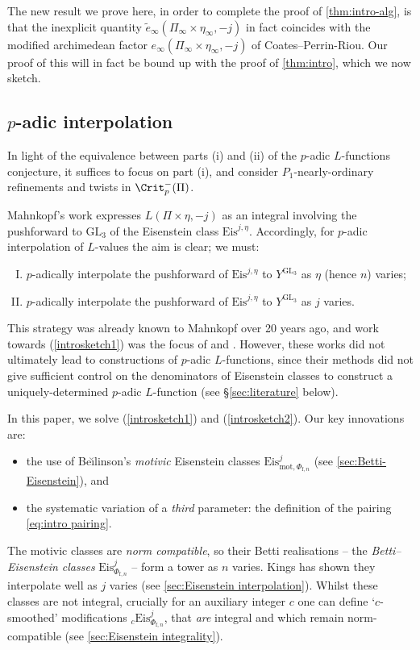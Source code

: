 \documentclass[10pt,reqno,a4paper]{amsart}
\newcommand{\GL}{\mathrm{GL}}
\begin{document}
The new result we prove here, in order to complete the proof of \cref{thm:intro-alg}, is that the inexplicit quantity $\widetilde{e}_{\infty}(\Pi_\infty \times \eta_\infty, -j)$ in fact coincides with the modified archimedean factor $e_\infty(\Pi_\infty \times \eta_\infty, -j)$ of Coates--Perrin-Riou. Our proof of this will in fact be bound up with the proof of \cref{thm:intro}, which we now sketch.

\subsection{\texorpdfstring{$p$-adic interpolation}{P-adic interpolation}}
\label{sec:p-adic interpolation}
 In light of the equivalence between parts (i) and (ii) of the $p$-adic $L$-functions conjecture, it suffices to focus on part (i), and consider $P_1$-nearly-ordinary refinements and twists in $\Crit^-_p(\Pi)$.

Mahnkopf's work expresses $L(\Pi\times\eta,-j)$ as an integral involving the pushforward to $\GL_3$ of the Eisenstein class $\mathrm{Eis}^{j,\eta}$. Accordingly, for $p$-adic interpolation of $L$-values the aim is clear; we must:
\begin{enumerate}[(I)]\setlength{\itemsep}{0pt}
	\item\label{introsketch1} $p$-adically interpolate the pushforward of $\mathrm{Eis}^{j,\eta}$ to $Y^{\GL_3}$ as $\eta$ (hence $n$) varies;
	\item\label{introsketch2} $p$-adically interpolate the pushforward of $\mathrm{Eis}^{j,\eta}$ to $Y^{\GL_3}$ as $j$ varies.
\end{enumerate}
This strategy was already known to Mahnkopf over 20 years ago, and work towards (\ref{introsketch1}) was the focus of \cite{Mah00} and \cite{Ger15}. However, these works did not ultimately lead to constructions of $p$-adic $L$-functions, since their methods did not give sufficient control on the denominators of Eisenstein classes to construct a uniquely-determined $p$-adic $L$-function (see \S\ref{sec:literature} below).

In this paper, we solve (\ref{introsketch1}) and (\ref{introsketch2}). Our key innovations are:
\begin{itemize}\setlength{\itemsep}{0pt}
\item[--] the use of Be\u{\i}linson's \emph{motivic} Eisenstein classes $\mathrm{Eis}^j_{\mathrm{mot},\Phi_{\mathrm{f},n}}$ (see \cref{sec:Betti-Eisenstein}), and
\item[--] the  systematic variation of a \emph{third} parameter:  the definition of the pairing \eqref{eq:intro pairing}.
\end{itemize}
The motivic classes are \emph{norm compatible}, so their Betti realisations -- the \emph{Betti--Eisenstein classes} $\mathrm{Eis}^j_{\Phi_{\mathrm{f},n}}$ -- form a tower as $n$ varies. Kings has shown they interpolate well as $j$ varies (see \cref{sec:Eisenstein interpolation}). Whilst these classes are not integral, crucially for an auxiliary integer $c$ one can define `$c$-smoothed' modifications ${}_c \mathrm{Eis}_{\Phi_{\mathrm{f},n}}^j$, that \emph{are} integral and which remain norm-compatible (see \cref{sec:Eisenstein integrality}).
\end{document}

